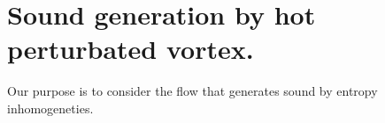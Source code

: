 


	\maketitle
	
	
	\newpage
	
	\tableofcontents %
	\label{content}
	\newpage
	
	\section{Sound generation by hot perturbated vortex.}
	
	Our purpose is to consider the flow that generates sound by entropy inhomogeneties.
	
	
	
	
	
	
	
	
	
	
	
	
	
	
	
	
	
	\newpage
	

